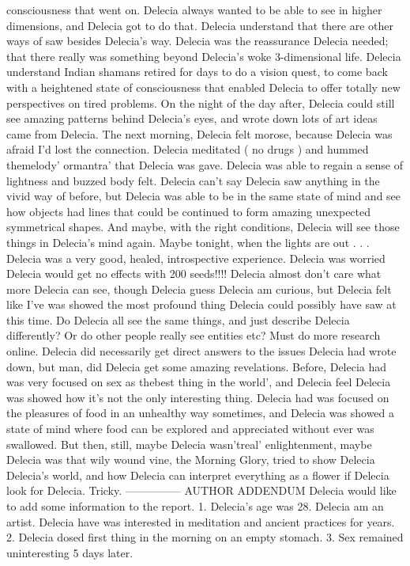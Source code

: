 \documentclass[12pt]{book}
\begin{document}
consciousness that went on. Delecia always wanted to be able to see in higher dimensions, and Delecia got to do that. Delecia understand that there are other ways of saw besides Delecia's way. Delecia was the reassurance Delecia needed; that there really was something beyond Delecia's woke 3-dimensional life. Delecia understand Indian shamans retired for days to do a vision quest, to come back with a heightened state of consciousness that enabled Delecia to offer totally new perspectives on tired problems. On the night of the day after, Delecia could still see amazing patterns behind Delecia's eyes, and wrote down lots of art ideas came from Delecia. The next morning, Delecia felt morose, because Delecia was afraid I'd lost the connection. Delecia meditated ( no drugs ) and hummed themelody' ormantra' that Delecia was gave. Delecia was able to regain a sense of lightness and buzzed body felt. Delecia can't say Delecia saw anything in the vivid way of before, but Delecia was able to be in the same state of mind and see how objects had lines that could be continued to form amazing unexpected symmetrical shapes. And maybe, with the right conditions, Delecia will see those things in Delecia's mind again. Maybe tonight, when the lights are out . . .  Delecia was a very good, healed, introspective experience. Delecia was worried Delecia would get no effects with 200 seeds!!!! Delecia almost don't care what more Delecia can see, though Delecia guess Delecia am curious, but Delecia felt like I've was showed the most profound thing Delecia could possibly have saw at this time. Do Delecia all see the same things, and just describe Delecia differently? Or do other people really see entities etc? Must do more research online. Delecia did necessarily get direct answers to the issues Delecia had wrote down, but man, did Delecia get some amazing revelations. Before, Delecia had was very focused on sex as thebest thing in the world', and Delecia feel Delecia was showed how it's not the only interesting thing. Delecia had was focused on the pleasures of food in an unhealthy way sometimes, and Delecia was showed a state of mind where food can be explored and appreciated without ever was swallowed. But then, still, maybe Delecia wasn'treal' enlightenment, maybe Delecia was that wily wound vine, the Morning Glory, tried to show Delecia Delecia's world, and how Delecia can interpret everything as a flower if Delecia look for Delecia. Tricky. --------------- AUTHOR ADDENDUM Delecia would like to add some information to the report. 1. Delecia's age was 28. Delecia am an artist. Delecia have was interested in meditation and ancient practices for years. 2. Delecia dosed first thing in the morning on an empty stomach. 3. Sex remained uninteresting 5 days later.
\end{document}
